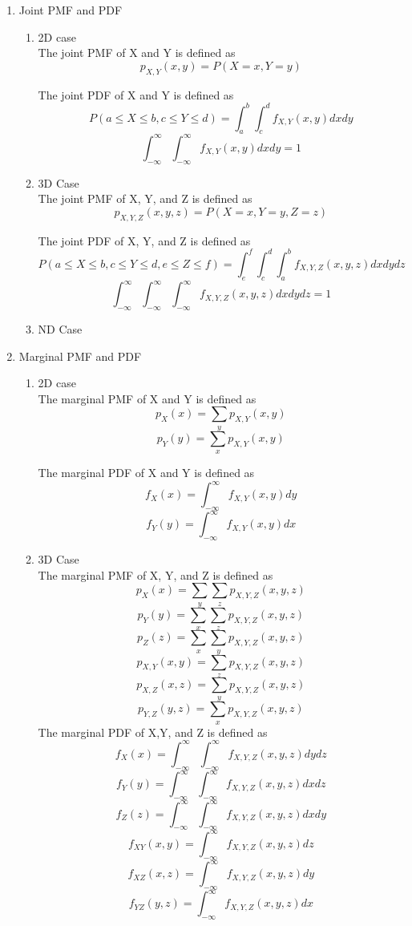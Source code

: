 \documentclass{article}
\begin{document}
\begin{enumerate}
    \item Joint PMF and PDF \\
    \begin{enumerate}
        \item 2D case \\
        The joint PMF of X and Y is defined as 
        $$p_{X,Y}(x,y) = P(X = x, Y = y)$$

        The joint PDF of X and Y is defined as
        $$P(a \leq X \leq b,c \leq Y \leq d) = \int_a^b\int_c^df_{X,Y}(x,y)dxdy$$
        $$\int_{-\infty}^{\infty}\int_{-\infty}^{\infty} f_{X,Y}(x,y)dxdy = 1$$
        \item 3D Case \\
        The joint PMF of X, Y, and Z is defined as 
        $$p_{X,Y,Z}(x,y,z) = P(X = x, Y = y,Z = z)$$

        The joint PDF of X, Y, and Z is defined as
        $$P(a \leq X \leq b, c \leq Y \leq d, e \leq Z \leq f) = \int_{e}^{f}\int_{c}^{d}\int_{a}^{b}f_{X,Y,Z}(x,y,z)dxdydz$$
        $$\int_{-\infty}^{\infty}\int_{-\infty}^{\infty}\int_{-\infty}^{\infty} f_{X,Y,Z}(x,y,z)dxdydz = 1 $$
        
        \item ND Case \\
        
    \end{enumerate}
    
    \item Marginal PMF and PDF \\ 
    \begin{enumerate}
        \item 2D case \\
        The marginal PMF of X and Y is defined as
        $$p_X(x) = \sum_{y}p_{X,Y}(x,y)$$
        $$p_Y(y) = \sum_{x}p_{X,Y}(x,y)$$

        The marginal PDF of X and Y is defined as 
        $$f_X(x) = \int_{-\infty}^{\infty}f_{X,Y}(x,y)dy$$
        $$f_Y(y) = \int_{-\infty}^{\infty}f_{X,Y}(x,y)dx$$
        \item 3D Case \\
        The marginal PMF of X, Y, and Z is defined as
        $$p_X(x) = \sum_{y}\sum_{z}p_{X,Y,Z}(x,y,z)$$
        $$p_Y(y) = \sum_{x}\sum_{z}p_{X,Y,Z}(x,y,z)$$
        $$p_Z(z) = \sum_{x}\sum_{y}p_{X,Y,Z}(x,y,z)$$
        $$p_{X,Y}(x,y) = \sum_{z}p_{X,Y,Z}(x,y,z)$$
        $$p_{X,Z}(x,z) = \sum_{y}p_{X,Y,Z}(x,y,z)$$
        $$p_{Y,Z}(y,z) = \sum_{x}p_{X,Y,Z}(x,y,z)$$
        The marginal PDF of X,Y, and Z is defined as 
        $$f_X(x) = \int_{-\infty}^{\infty}\int_{-\infty}^{\infty}f_{X,Y,Z}(x,y,z)dydz$$
        $$f_Y(y) = \int_{-\infty}^{\infty}\int_{-\infty}^{\infty}f_{X,Y,Z}(x,y,z)dxdz$$
        $$f_Z(z) = \int_{-\infty}^{\infty}\int_{-\infty}^{\infty}f_{X,Y,Z}(x,y,z)dxdy$$
        $$f_{XY}(x,y) = \int_{-\infty}^{\infty}f_{X,Y,Z}(x,y,z)dz$$
        $$f_{XZ}(x,z) = \int_{-\infty}^{\infty}f_{X,Y,Z}(x,y,z)dy$$
        $$f_{YZ}(y,z) = \int_{-\infty}^{\infty}f_{X,Y,Z}(x,y,z)dx$$
        

\end{enumerate}
\end{enumerate}
\end{document}
